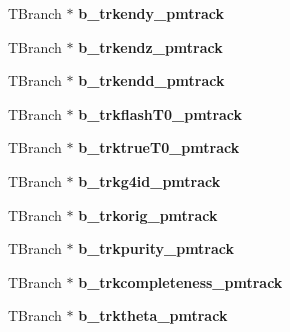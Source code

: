 \begin{DoxyCompactItemize}
\item 
\hypertarget{classanatree_a3300720e9ea9e8ca3e7b648caf2b1114}{T\-Branch $\ast$ {\bfseries b\-\_\-trkendy\-\_\-pmtrack}}\label{classanatree_a3300720e9ea9e8ca3e7b648caf2b1114}

\item 
\hypertarget{classanatree_a8987b8eed2e0f9ac5dccee1eee8507a5}{T\-Branch $\ast$ {\bfseries b\-\_\-trkendz\-\_\-pmtrack}}\label{classanatree_a8987b8eed2e0f9ac5dccee1eee8507a5}

\item 
\hypertarget{classanatree_a601a500778c2722c487fd097a326e53c}{T\-Branch $\ast$ {\bfseries b\-\_\-trkendd\-\_\-pmtrack}}\label{classanatree_a601a500778c2722c487fd097a326e53c}

\item 
\hypertarget{classanatree_a76df837d69832b19d63e7d8de1083f87}{T\-Branch $\ast$ {\bfseries b\-\_\-trkflash\-T0\-\_\-pmtrack}}\label{classanatree_a76df837d69832b19d63e7d8de1083f87}

\item 
\hypertarget{classanatree_a34c8d5f821ce93c2e0859ecec72b6484}{T\-Branch $\ast$ {\bfseries b\-\_\-trktrue\-T0\-\_\-pmtrack}}\label{classanatree_a34c8d5f821ce93c2e0859ecec72b6484}

\item 
\hypertarget{classanatree_a00dcbd3c1b7f5292070196712c827f31}{T\-Branch $\ast$ {\bfseries b\-\_\-trkg4id\-\_\-pmtrack}}\label{classanatree_a00dcbd3c1b7f5292070196712c827f31}

\item 
\hypertarget{classanatree_a899eb69e6decc594b6b2f9f0e99cabc6}{T\-Branch $\ast$ {\bfseries b\-\_\-trkorig\-\_\-pmtrack}}\label{classanatree_a899eb69e6decc594b6b2f9f0e99cabc6}

\item 
\hypertarget{classanatree_ab760353df144ef75e96fe6b08f61d407}{T\-Branch $\ast$ {\bfseries b\-\_\-trkpurity\-\_\-pmtrack}}\label{classanatree_ab760353df144ef75e96fe6b08f61d407}

\item 
\hypertarget{classanatree_a9311a2e8106df4e646f1e03832b8e2b2}{T\-Branch $\ast$ {\bfseries b\-\_\-trkcompleteness\-\_\-pmtrack}}\label{classanatree_a9311a2e8106df4e646f1e03832b8e2b2}

\item 
\hypertarget{classanatree_a1de5332e834fd99b4b979531a783a0b7}{T\-Branch $\ast$ {\bfseries b\-\_\-trktheta\-\_\-pmtrack}}\label{classanatree_a1de5332e834fd99b4b979531a783a0b7}


\end{DoxyCompactItemize}
